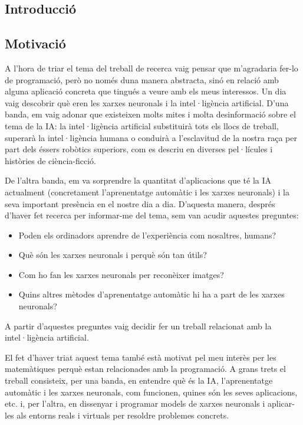 \begin{refsection}

	\chapter{Introducció}

	\section{Motivació}

	A l'hora de triar el tema del treball de recerca vaig pensar que m'agradaria fer-lo de programació, però no només duna manera abstracta, sinó en relació amb alguna aplicació concreta que tingués a veure amb els meus interessos. Un dia vaig descobrir què eren les xarxes neuronals i la intel·ligència artificial. D'una banda, em vaig adonar que existeixen molts mites i molta desinformació sobre el tema de la IA: la intel·ligència artificial substituirà tots els llocs de treball, superarà la intel·ligència humana o conduirà a l'esclavitud de la nostra raça per part dels éssers robòtics superiors, com es descriu en diverses pel·lícules i històries de ciència-ficció.

	De l'altra banda, em va sorprendre la quantitat d'aplicacions que té la IA actualment  (concretament l'aprenentatge automàtic i les xarxes neuronals) i la seva important presència en el nostre dia a dia. D'aquesta manera, després d'haver fet recerca per informar-me del tema, sem van acudir aquestes preguntes:

	\begin{itemize}
		\item Poden els ordinadors aprendre de l'experiència com nosaltres, humans?
		\item Què són les xarxes neuronals i perquè són tan útils?
		\item Com ho fan les xarxes neuronals per reconèixer imatges?
		\item Quins altres mètodes d'aprenentatge automàtic hi ha a part de les xarxes neuronals?
	\end{itemize}

	A partir d'aquestes preguntes vaig decidir fer un treball relacionat amb la intel·ligència artificial.

	El fet d'haver triat aquest tema també està motivat pel meu interès per les matemàtiques perquè estan relacionades amb la programació. A grans trets el treball consisteix, per una banda, en entendre què és la IA, l'aprenentatge automàtic i les xarxes neuronals, com funcionen, quines són les seves aplicacions, etc. i, per l'altra, en dissenyar i programar models de xarxes neuronals i aplicar-les als entorns reals i virtuals per resoldre problemes concrets.


\end{refsection}
